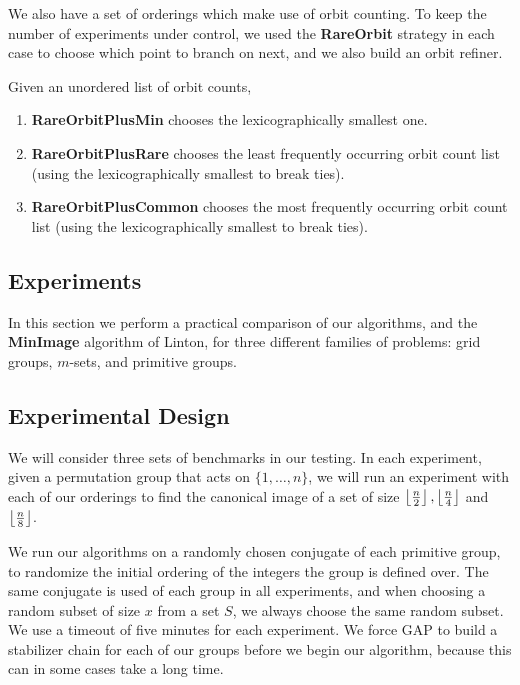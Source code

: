 We also have a set of orderings which make use of orbit counting. To keep the
number of experiments under control, we used the \textbf{RareOrbit}
strategy in each case to choose which point to branch on next, and we also build an orbit
refiner.

Given an unordered list of orbit counts,
\begin{enumerate}
\item \textbf{RareOrbitPlusMin} chooses the lexicographically smallest one.
\item \textbf{RareOrbitPlusRare} chooses the least frequently occurring orbit
  count list (using the lexicographically smallest to break ties).
\item \textbf{RareOrbitPlusCommon} chooses the most frequently occurring orbit
  count list (using the lexicographically smallest to break ties).
\end{enumerate}

\subsection{Experiments}\label{sec:experiments}

In this section we perform a practical comparison of our algorithms, and the
\textbf{MinImage} algorithm of Linton, for three different families of problems:
grid groups, $m$-sets, and primitive groups.

\subsection{Experimental Design}\label{sec:probdef}

We will consider three sets of benchmarks in our testing. In each experiment,
given a permutation group that acts on \(\{1,\dots,n\}\), we will run
an experiment with each of our orderings to find the canonical image of a set of
size \(\left \lfloor \frac{n}{2} \right \rfloor, \left \lfloor \frac{n}{4} \right \rfloor\) and
\(\left \lfloor \frac{n}{8} \right \rfloor\).

We run our algorithms on a randomly chosen conjugate of each primitive group, to
randomize the initial ordering of the integers the group is defined over. The
same conjugate is used of each group in all experiments, and when choosing a
random subset of size \(x\) from a set \(S\), we always choose the same random
subset. We use a timeout of five minutes for each experiment. We force GAP to build
a stabilizer chain for each of our groups before we begin our algorithm, because
this can in some cases take a long time.

